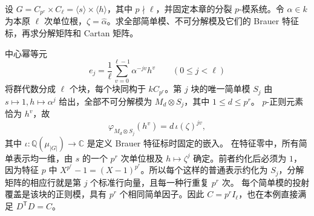 \begin{optionalexercise}\label{b5:ex:08-cyclic-mixed-brauer}
	设 \(G=C_{p^r}\times C_\ell=\langle s\rangle\times\langle h\rangle\)，其中 \(p\nmid\ell\)，并固定本章的分裂 \(p\)-模系统。令 \(\alpha\in k\) 为本原 \(\ell\) 次单位根，\(\zeta=\widehat\alpha\)。求全部简单模、不可分解模及它们的 Brauer 特征标，再求分解矩阵和 Cartan 矩阵。
\end{optionalexercise}
\begin{solution}
	中心幂等元
	\[
		e_j=\frac1\ell\sum_{v=0}^{\ell-1}\alpha^{-jv}h^v \qquad(0\leq j<\ell)
	\]
	将群代数分成 \(\ell\) 个块，每个块同构于 \(kC_{p^r}\)。第 \(j\) 块的唯一简单模 \(S_j\) 由 \(s\mapsto1,h\mapsto\alpha^j\) 给出，全部不可分解模为 \(M_d\otimes S_j\)，其中 \(1\leq d\leq p^r\)。 \(p\)-正则元素恰为 \(h^v\)，故
	\[
		\varphi_{M_d\otimes S_j}(h^v)=d\,\iota(\zeta)^{jv},
	\]
	其中 \(\iota:\mathbb Q(\mu_{|G|})\to\mathbb C\) 是定义 Brauer 特征标时固定的嵌入。 在特征零中，所有简单表示均一维，由 \(s\) 的一个 \(p^r\) 次单位根及 \(h\mapsto\zeta^j\) 确定。前者约化后必须为 \(1\)，因为特征 \(p\) 中 \(X^{p^r}-1=(X-1)^{p^r}\)。所以每个这样的普通表示约化为 \(S_j\)，分解矩阵的相应行就是第 \(j\) 个标准行向量，且每一种行重复 \(p^r\) 次。 每个简单模的投射覆盖是该块的正则模，具有 \(p^r\) 个相同简单因子。因此 \(C=p^rI_\ell\)，也在本例直接满足 \(D^{\mathsf T}D=C\)。
\end{solution}

